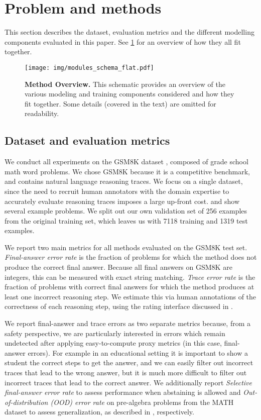 \documentclass[11pt, a4paper, logo]{deepmind}
\begin{document}
\section{Problem and methods}
\label{sec:problem_methods}

This section describes the dataset, evaluation metrics and the different modelling components evaluated in this paper. See \cref{fig:overview} for an overview of how they all fit together.

\begin{figure}[t!]
\centering
\texttt{[image: img/modules\_schema\_flat.pdf]}
\caption{\textbf{Method Overview.} This schematic provides an overview of the various modeling and training components considered and how they fit together.  Some details (covered in the text) are omitted for readability.
\label{fig:overview}}
\end{figure}

\subsection{Dataset and evaluation metrics}
We conduct all experiments on the GSM8K dataset \citep{cobbe2021training}, composed of grade school math word problems.
We chose GSM8K because it is a competitive benchmark, and contains natural language reasoning traces. We focus on a single dataset, since the need to recruit human annotators with the domain expertise to accurately evaluate reasoning traces imposes a large up-front cost.
 and  show several example problems.
We split out our own validation set of 256 examples from the original training set, which leaves us with 7118 training and 1319 test examples.

We report two main metrics for all methods evaluated on the GSM8K test set.
\textit{Final-answer error rate} is the fraction of problems for which the method does not produce the correct final answer.
Because all final answers on GSM8K are integers, this can be measured with exact string matching.
\textit{Trace error rate} is the fraction of problems with correct final answers for which the method produces at least one incorrect reasoning step.
We estimate this via human annotations of the correctness of each reasoning step, using the rating interface discussed in . 

We report final-answer and trace errors as two separate metrics because, from a safety perspective, we are particularly interested in errors which remain undetected after applying easy-to-compute proxy metrics (in this case, final-answer errors).
For example in an educational setting it is important to show a student the correct steps to get the answer, and we can easily filter out incorrect traces that lead to the wrong answer, but it is much more difficult to filter out incorrect traces that lead to the correct answer.
We additionally report \textit{Selective final-answer error rate} to assess performance when abstaining is allowed and \textit{Out-of-distribution (OOD) error rate} on pre-algebra problems from the MATH dataset to assess generalization, as described in , respectively.
\end{document}
